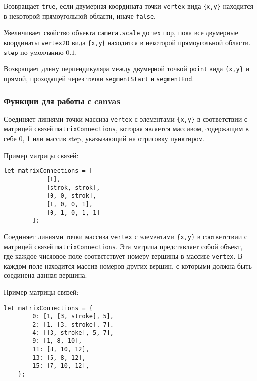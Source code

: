 Возвращает \texttt{true}, если двумерная координата точки \texttt{vertex} вида \texttt{\{x,y\}} находится в некоторой прямоугольной области, иначе \texttt{false}.

Увеличивает свойство объекта \texttt{camera.scale} до тех пор, пока все двумерные координаты \texttt{vertex2D} вида \texttt{\{x,y\}}  находится в некоторой прямоугольной области. \texttt{step} по умолчанию $0.1$.

Возвращает длину перпендикуляра между двумерной точкой \texttt{point} вида \texttt{\{x,y\}} и прямой, проходящей через точки \texttt{segmentStart} и \texttt{segmentEnd}.

\subsubsection{Функции для работы с canvas}

Соединяет линиями точки массива \texttt{vertex} с элементами \texttt{\{x,y\}} в соответствии с матрицей связей \texttt{matrixConnections}, которая является массивом, содержащим в себе 0, 1 или массив step, указывающий на отрисовку пунктиром.

Пример матрицы связей:
\begin{lstlisting}[numbers=none]
	let matrixConnections = [
			[1],
			[strok, strok],
			[0, 0, strok],
			[1, 0, 0, 1],
			[0, 1, 0, 1, 1]
		];
	\end{lstlisting}

Соединяет линиями точки массива \texttt{vertex} с элементами \texttt{\{x,y\}} в соответствии с матрицей связей \texttt{matrixConnections}. Эта матрица представляет собой объект, где каждое числовое поле соответствует номеру вершины в массиве \texttt{vertex}. В каждом поле находится массив номеров других вершин, с которыми должна быть соединена данная вершина.

Пример матрицы связей:
\begin{lstlisting}[numbers=none]
	let matrixConnections = {
		0: [1, [3, stroke], 5],
		2: [1, [3, stroke], 7],
		4: [[3, stroke], 5, 7],
		9: [1, 8, 10],
		11: [8, 10, 12],
		13: [5, 8, 12],
		15: [7, 10, 12],
	};
	\end{lstlisting}

